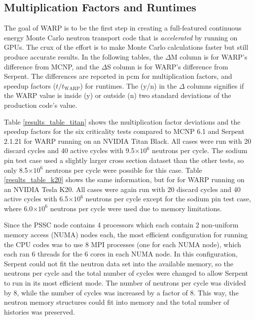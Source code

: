 \documentclass[preprint,12pt]{elsarticle}
\begin{document}
\subsection{Multiplication Factors and Runtimes}

The goal of WARP is to be the first step in creating a full-featured continuous energy Monte Carlo neutron transport code that is \emph{accelerated} by running on GPUs.  The crux of the effort is to make Monte Carlo calculations faster but still produce accurate results.  In the following tables, the $\Delta$M column is for WARP's difference from MCNP, and the $\Delta$S column is for WARP's difference from Serpent.  The differences are reported in pcm for multiplication factors, and speedup factors ($t/t_\mathrm{WARP}$) for runtimes.  The (y/n) in the $\Delta$ columns signifies if the WARP value is inside (y) or outside (n) two standard deviations of the production code's value. 

Table \ref{results_table_titan} shows the multiplication factor deviations and the speedup factors for the six criticality tests compared to MCNP 6.1 and Serpent 2.1.21 for WARP running on an NVIDIA Titan Black.   All cases were run with 20 discard cycles and 40 active cycles with 9.5$\times10^{6}$ neutrons per cycle.  The sodium pin test case used a slightly larger cross section dataset than the other tests, so only 8.5$\times10^{6}$ neutrons per cycle were possible for this case.  Table  \ref{results_table_k20} shows the same information, but for for WARP running on an NVIDIA Tesla K20.  All cases were again run with 20 discard cycles and 40 active cycles with 6.5$\times10^{6}$ neutrons per cycle except for the sodium pin test case, where 6.0$\times10^{6}$ neutrons per cycle were used due to memory limitations.

Since the PSSC node contains 4 processors which each contain 2 non-uniform memory access (NUMA) nodes each, the most efficient configuration for running the CPU codes was to use 8 MPI processes (one for each NUMA node), which each ran 6 threads for the 6 cores in each NUMA node.  In this configuration, Serpent could not fit the neutron data set into the available memory, so the neutrons per cycle and the total number of cycles were changed to allow Serpent to run in its most efficient mode.  The number of neutrons per cycle was divided by 8, while the number of cycles was increased by a factor of 8.  This way, the neutron memory structures could fit into memory and the total number of histories was preserved.
\end{document}
